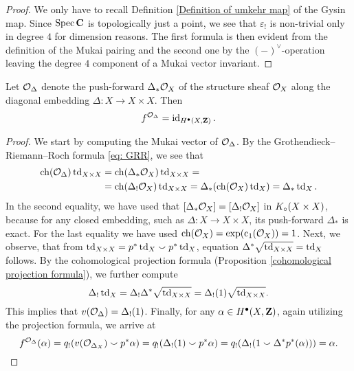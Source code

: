 \begin{proof}
    We only have to recall Definition \ref{Definition of umkehr map} of the Gysin map. Since $\operatorname{Spec}\mathbf C$ is topologically just a point, we see that $\varepsilon_!$ is non-trivial only in degree $4$ for dimension reasons. The first formula is then evident from the definition of the Mukai pairing and the second one by the $(-)^\vee$-operation leaving the degree $4$ component of a Mukai vector invariant.
\end{proof}

\begin{lemma}
    \label{cohomological fm of diagonal}
    Let ${\mathcal{O}_{\Delta}}$ denote the push-forward $\Delta_*{\mathcal{O}_{X}}$ of the structure sheaf ${\mathcal{O}_{X}}$ along the diagonal embedding $\Delta \colon X \to X \times X$. Then
    \[
        f^{{\mathcal{O}_{\Delta}}} = \operatorname{id}_{H^{\bullet}(X, \mathbf Z)}.
    \]
\end{lemma}

\begin{proof}
    We start by computing the Mukai vector of ${\mathcal{O}_{\Delta}}$. By the Grothendieck--Rie\-mann--Roch formula \eqref{eq: GRR}, we see that
    \begin{align*}
        \ch(\struct{\Delta}) \tdclass{X \times X} &= \ch(\Delta_*\struct{X})\tdclass{X \times X} = \\ &= \ch(\Delta_!\struct{X})\tdclass{X \times X} = \Delta_*(\ch(\struct{X}) \tdclass{X}) = \Delta_*\tdclass{X}.
    \end{align*}
    In the second equality, we have used that $[\Delta_*{\mathcal{O}_{X}}] = [\Delta_!{\mathcal{O}_{X}}]$ in $K_{\circ}(X \times X)$, because for any closed embedding, such as $\Delta \colon X \to X \times X$, its push-forward $\Delta_*$ is exact. For the last equality we have used $\ch(\struct{X}) = \exp(\cclass[1](\struct{X})) = 1$. Next, we observe, that from $\operatorname{td}_{X \times X} = p^*\operatorname{td}_{X} \smallsmile p^*\operatorname{td}_{X}$, equation $\Delta^*\sqrt{\operatorname{td}_{X\times X}} = \operatorname{td}_{X}$ follows. By the cohomological projection formula (\cf Proposition \ref{cohomological projection formula}), we further compute
    \[
        \Delta_!\operatorname{td}_{X} = \Delta_!\Delta^*\sqrt{\operatorname{td}_{X \times X}} = \Delta_!(1)\sqrt{\operatorname{td}_{X \times X}}.
    \] 
    This implies that $v({\mathcal{O}_{\Delta}}) = \Delta_!(1)$. 
    Finally, for any $\alpha \in H^{\bullet}(X, \mathbf Z)$, again utilizing  the projection formula, we arrive at
    \[
        f^{{\mathcal{O}_{\Delta}}}(\alpha) = q_!(v({\mathcal{O}_{\Delta_X}})\smallsmile p^*\alpha) = q_!(\Delta_!(1)\smallsmile p^*\alpha) = q_!(\Delta_!(1\smallsmile \Delta^*p^*(\alpha))) = \alpha. \qedhere
    \]
\end{proof}

